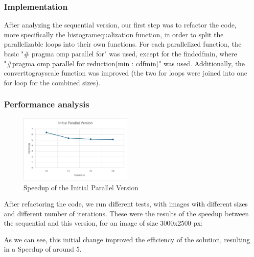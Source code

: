 \documentclass[sigconf]{acmart}
\begin{document}
\subsubsection{Implementation}
After analyzing the sequential version, our first step was to refactor the code, more specifically the histogram\textunderscore equalization function, in order to split the parallelizable loops into their own functions. For each parallelized function, the basic "\# pragma omp parallel for" was used, except for the find\textunderscore cdf\textunderscore min, where "\#pragma omp parallel for reduction(min : cdf\textunderscore min)" was used. Additionally, the convert\textunderscore to\textunderscore grayscale function was improved (the two for loops were joined into one for loop for the combined sizes).
\subsubsection{Performance analysis}
\begin{figure}[h]
    \centering
    \includegraphics[width=0.5\textwidth]{InitialParallelSpeedup.png}
    \caption{Speedup of the Initial Parallel Version}
\end{figure}
After refactoring the code, we run different tests, with images with different sizes and different number of iterations. These were the results of the speedup between the sequential and this version, for an image of size 3000x2500 px:



As we can see, this initial change improved the efficiency of the solution, resulting in a Speedup of around 5.
\end{document}
